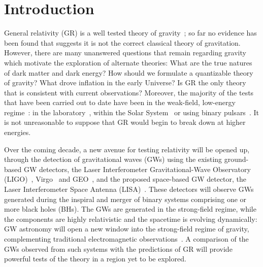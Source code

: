 \documentclass[aps,prd,amsfonts,amssymb,amsmath,nofootinbib,reprint,showpacs]{revtex4-1}
\begin{document}
\section{Introduction}

General relativity (GR) is a well tested theory of gravity~\cite{Will2006}; so far no evidence has been found that suggests it is not the correct classical theory of gravitation. However, there are many unanswered questions that remain regarding gravity which motivate the exploration of alternate theories: What are the true natures of dark matter and dark energy? How should we formulate a quantizable theory of gravity? What drove inflation in the early Universe?  Is GR the only theory that is consistent with current observations? Moreover, the majority of the tests that have been carried out to date have been in the weak-field, low-energy regime~\cite{Will2006, Will1993}: in the laboratory~\cite{Adelberger2009, Adelberger2003}, within the Solar System~\cite{Bertotti2003, Everitt2009} or using binary pulsars~\cite{Stairs2003}. It is not unreasonable to suppose that GR would begin to break down at higher energies.

Over the coming decade, a new avenue for testing relativity will be opened up, through the detection of gravitational waves (GWs) using the existing ground-based GW detectors, the Laser Interferometer Gravitational-Wave Observatory (LIGO)~\cite{Abramovici1992, Abbott2009}, Virgo~\cite{Accadia2010} and GEO~\cite{Willke2002, Abadie2010}, and the proposed space-based GW detector, the Laser Interferometer Space Antenna (LISA)~\cite{Bender1998, Danzmann2003}. These detectors will observe GWs generated during the inspiral and merger of binary systems comprising one or more black holes (BHs). The GWs are generated in the strong-field regime, while the components are highly relativistic and the spacetime is evolving dynamically: GW astronomy will open a new window into the strong-field regime of gravity, complementing traditional electromagnetic observations~\cite{Psaltis2008a}.  A comparison of the GWs observed from such systems with the predictions of GR will provide powerful tests of the theory in a region yet to be explored.
\end{document}
